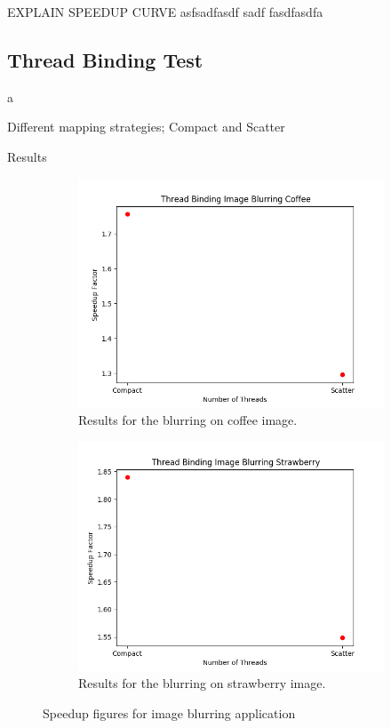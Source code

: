 \documentclass{article}
\begin{document}
EXPLAIN SPEEDUP CURVE
\newline
asfsadfasdf
sadf
fasdfasdfa
\newpage

\subsection{Thread Binding Test}
a
\begin{description}
    \item[Different mapping strategies; Compact and Scatter]
\end{description}
 Results 
 \begin{figure}[!htb]
    \centering
    \begin{subfigure}{.45\textwidth}
        \centering
        \includegraphics[width=1\linewidth]{./img/binding_part_1_B_coffee.png}
        \caption{Results for the blurring on coffee image.}
    \end{subfigure} 
    \begin{subfigure}{.45\textwidth}
        \centering
        \includegraphics[width=1\linewidth]{./img/binding_part_1_B_strawberry.png}
        \caption{Results for the blurring on strawberry image.}
    \end{subfigure}
    \caption{Speedup figures for image blurring application}
\end{figure}
\end{document}
